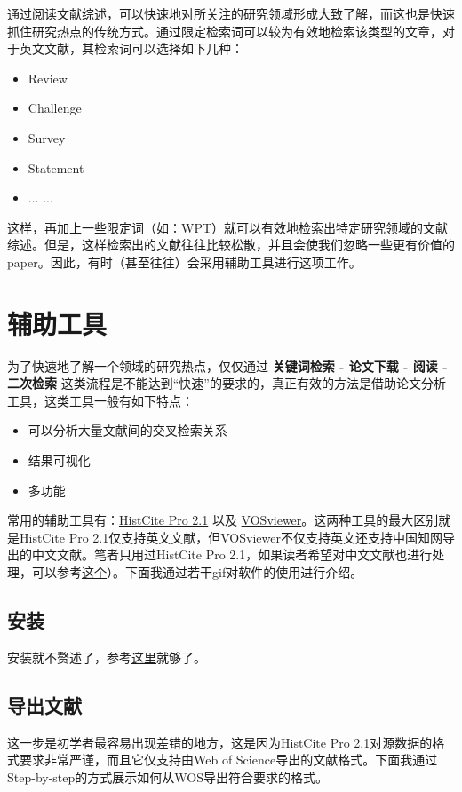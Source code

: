 \documentclass[UTF8]{ctexbook}
\begin{document}
通过阅读文献综述，可以快速地对所关注的研究领域形成大致了解，而这也是快速抓住研究热点的传统方式。通过限定检索词可以较为有效地检索该类型的文章，对于英文文献，其检索词可以选择如下几种：
\begin{itemize}
	\item Review
	\item Challenge
	\item Survey
	\item Statement
	\item ... ...
\end{itemize}

这样，再加上一些限定词（如：WPT）就可以有效地检索出特定研究领域的文献综述。但是，这样检索出的文献往往比较松散，并且会使我们忽略一些更有价值的paper。因此，有时（甚至往往）会采用辅助工具进行这项工作。

\section{辅助工具}
为了快速地了解一个领域的研究热点，仅仅通过 {\bf 关键词检索 - 论文下载 - 阅读 - 二次检索} 这类流程是不能达到“快速”的要求的，真正有效的方法是借助论文分析工具，这类工具一般有如下特点：

\begin{itemize}
	\item 可以分析大量文献间的交叉检索关系
	\item 结果可视化
	\item 多功能
\end{itemize}

常用的辅助工具有：\href{https://zhuanlan.zhihu.com/p/20902898}{HistCite Pro 2.1} 以及 \href{https://zhuanlan.zhihu.com/p/30970993}{VOSviewer}。这两种工具的最大区别就是HistCite Pro 2.1仅支持英文文献，但VOSviewer不仅支持英文还支持中国知网导出的中文文献。笔者只用过HistCite Pro 2.1，如果读者希望对中文文献也进行处理，可以参考\href{https://www.jianshu.com/p/e20f3f1d17d8}{这个}）。下面我通过若干gif对软件的使用进行介绍。
\subsection{安装}
安装就不赘述了，参考\href{https://zhuanlan.zhihu.com/p/20902898}{这里}就够了。
\subsection{导出文献}
这一步是初学者最容易出现差错的地方，这是因为HistCite Pro 2.1对源数据的格式要求非常严谨，而且它仅支持由Web of Science导出的文献格式。下面我通过Step-by-step的方式展示如何从WOS导出符合要求的格式。
\end{document}
